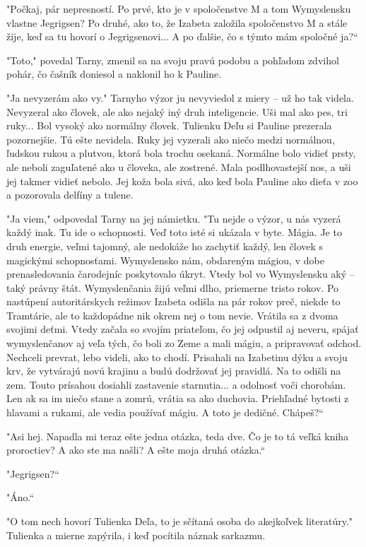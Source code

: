 \documentclass{book}
\begin{document}
"Počkaj, pár nepresností. Po prvé, kto je v spoločenstve M a tom Wymyslensku vlastne Jegrigsen? Po druhé, ako to, že Izabeta založila spoločenstvo M a stále žije, keď sa tu hovorí o Jegrigsenovi... A po ďalšie, čo s týmto mám spoločné ja?“

"Toto,"$ $ povedal Tarny, zmenil sa na svoju pravú podobu a pohľadom zdvihol pohár, čo čašník doniesol a naklonil ho k Pauline.

"Ja nevyzerám ako vy."$ $ Tarnyho výzor ju nevyviedol z miery – už ho tak videla. Nevyzeral ako človek, ale ako nejaký iný druh inteligencie. Uši mal ako pes, tri ruky... Bol vysoký ako normálny človek. Tulienku Deľu si Pauline prezerala pozornejšie. Tú ešte nevidela. Ruky jej vyzerali ako niečo medzi normálnou, ľudskou rukou a plutvou, ktorá bola trochu osekaná. Normálne bolo vidieť prsty, ale neboli zaguľatené ako u človeka, ale zostrené. Mala podlhovastejší nos, a uši jej takmer vidieť nebolo. Jej koža bola sivá, ako keď bola Pauline ako dieťa v zoo a pozorovala delfíny a tulene.

"Ja viem,"$ $ odpovedal Tarny na jej námietku. "Tu nejde o výzor, u nás vyzerá každý inak. Tu ide o schopnosti. Veď toto isté si ukázala v byte. Mágia. Je to druh energie, veľmi tajomný, ale nedokáže ho zachytiť každý, len človek s magickými schopnosťami. Wymyslensko nám, obdareným mágiou, v dobe prenasledovania čarodejníc poskytovalo úkryt. Vtedy bol vo Wymyslensku aký – taký právny štát. Wymyslenčania žijú veľmi dlho, priemerne tristo rokov. Po nastúpení autoritárskych režimov Izabeta odišla na pár rokov preč, niekde to Tramtárie, ale to každopádne nik okrem nej o tom nevie. Vrátila sa z dvoma svojimi deťmi. Vtedy začala so svojím priateľom, čo jej odpustil aj neveru, spájať wymyslenčanov aj veľa tých, čo boli zo Zeme a mali mágiu, a pripravovať odchod. Nechceli prevrat, lebo videli, ako to chodí. Prisahali na Izabetinu dýku a svoju krv, že vytvárajú novú krajinu a budú dodržovať jej pravidlá. Na to odišli na zem. Touto prísahou dosiahli zastavenie starnutia... a odolnosť voči chorobám. Len ak sa im niečo stane a zomrú, vrátia sa ako duchovia. Priehľadné bytosti z hlavami a rukami, ale vedia používať mágiu. A toto je dedičné. Chápeš?“

"$ $Asi hej. Napadla mi teraz ešte jedna otázka, teda dve. Čo je to tá veľká kniha proroctiev? A ako ste ma našli? A ešte moja druhá otázka.“

"Jegrigsen?“

"Áno.“

"$ $O tom nech hovorí Tulienka Deľa, to je sčítaná osoba do akejkoľvek literatúry."$ $ Tulienka a mierne zapýrila, i keď pocítila náznak sarkazmu.
\end{document}
